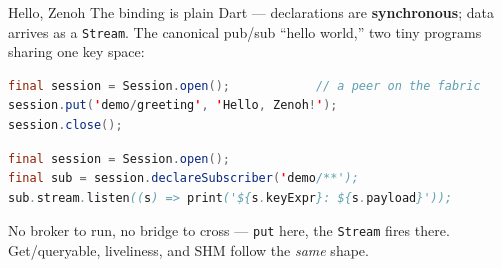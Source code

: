 \documentclass[9pt]{beamer}
\begin{document}
\begin{frame}[fragile]{Hello, Zenoh}
  The binding is plain Dart --- declarations are \textbf{synchronous}; data arrives as a \texttt{Stream}. The canonical pub/sub ``hello world,'' two tiny programs sharing one key space:

\begin{lstlisting}[language=Java, title=Publisher]
final session = Session.open();            // a peer on the fabric
session.put('demo/greeting', 'Hello, Zenoh!');
session.close();
\end{lstlisting}

\vspace{0.35em}
\begin{lstlisting}[language=Java, title=Subscriber]
final session = Session.open();
final sub = session.declareSubscriber('demo/**');
sub.stream.listen((s) => print('${s.keyExpr}: ${s.payload}'));
\end{lstlisting}

  \vspace{0.35em}
  {\small No broker to run, no bridge to cross --- \texttt{put} here, the \texttt{Stream} fires there. Get/queryable, liveliness, and SHM follow the \emph{same} shape.}
\end{frame}
\end{document}
